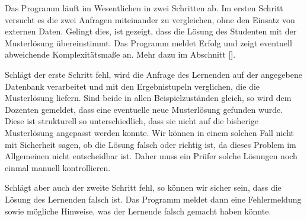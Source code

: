 Das Programm läuft im Wesentlichen in zwei Schritten ab. Im ersten Schritt versucht es die zwei Anfragen miteinander zu vergleichen, ohne den Einsatz von externen Daten. Gelingt dies, ist gezeigt, dass die Lösung des Studenten mit der Musterlösung übereinstimmt. Das Programm meldet Erfolg und zeigt eventuell abweichende Komplexitätsmaße an. Mehr dazu im Abschnitt [].

Schlägt der erste Schritt fehl, wird die Anfrage des Lernenden auf der angegebene Datenbank verarbeitet und mit den Ergebnistupeln verglichen, die die Musterlösung liefern. Sind beide in allen Beispielzuständen gleich, so wird dem Dozenten gemeldet, dass eine eventuelle neue Musterlösung gefunden wurde. Diese ist strukturell so unterschiedlich, dass sie nicht auf die bisherige Musterlösung angepasst werden konnte. Wir können in einem solchen Fall nicht mit Sicherheit sagen, ob die Lösung falsch oder richtig ist, da dieses Problem im Allgemeinen nicht entscheidbar ist. Daher muss ein Prüfer solche Lösungen noch einmal manuell kontrollieren.

Schlägt aber auch der zweite Schritt fehl, so können wir sicher sein, dass die Lösung des Lernenden falsch ist. Das Programm meldet dann eine Fehlermeldung sowie mögliche Hinweise, was der Lernende falsch gemacht haben könnte.


